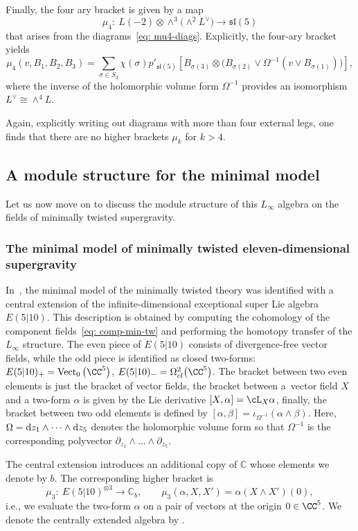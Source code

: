 \documentclass[pdftex]{sigma}
\numberwithin{equation}{section}
\theoremstyle{definition}
\def\C{\mathbb{C}}
\DeclareMathOperator{\Vect}{Vect}
\def\d{{\rm d}}
\begin{document}
Finally, the four ary bracket is given by a map
\[
 \mu_4 \colon\ L(-2) \otimes \wedge^3\big(\wedge^2 L^\vee\big) \longrightarrow \mathfrak{sl}(5)
\]
that arises from the diagrams~\eqref{eq: mu4-diags}. Explicitly, the four-ary bracket yields
\[
 \mu_4(v,B_1,B_2,B_3) = \sum_{\sigma \in S_3} \chi(\sigma) p'_{\mathfrak{sl}(5)} \left[ B_{\sigma(3)} \otimes \big( B_{\sigma(2)} \vee \Omega^{-1} (v \vee B_{\sigma(1)}) \big) \right],
\]
where the inverse of the holomorphic volume form $\Omega^{-1}$ provides an isomorphism $L^\vee \cong \wedge^4 L$.

Again, explicitly writing out diagrams with more than four external legs, one finds that there are no higher brackets $\mu_k$ for $k>4$.


\subsection{A module structure for the minimal model} \label{sec: min-module}
Let us now move on to discuss the module structure of this $L_\infty$ algebra on the fields of minimally twisted supergravity.

\subsubsection{The minimal model of minimally twisted eleven-dimensional supergravity}
In~\cite{RSW}, the minimal model of the minimally twisted theory was identified with a central extension of the infinite-dimensional exceptional super Lie algebra $E(5|10)$. This description is obtained by computing the cohomology of the component fields~\eqref{eq: comp-min-tw} and performing the homotopy transfer of the $L_\infty$ structure. The even piece of $E(5|10)$ consists of divergence-free vector fields, while the odd piece is identified as closed two-forms:
$
 E(5|10)_+ = \Vect_0\big(\CC^5\big) $, $ E(5|10)_- = \Omega^2_{cl}\big(\CC^5\big) $.
The bracket between two even elements is just the bracket of vector fields, the bracket between a~vector field $X$ and a two-form $\alpha$ is given by the Lie derivative
$
 [X,\alpha] = \cL_X \alpha$,
finally, the bracket between two odd elements is defined by
$
 [\alpha, \beta] = \iota_{\Omega^{-1}} (\alpha \wedge \beta)$.
Here, $\Omega = \d z_1 \wedge \dots \wedge \d z_5$ denotes the holomorphic volume form so that $\Omega^{-1}$ is the corresponding polyvector $\partial_{z_1} \wedge \dots \wedge \partial_{z_5}$.

The central extension introduces an additional copy of $\C$ whose elements we denote by $b$. The corresponding higher bracket is
\[ %
 \mu_3\colon\ E(5|10)^{\otimes 3} \longrightarrow \C_b, \qquad \mu_3(\alpha, X, X') = \alpha(X \wedge X')(0) ,
\]
i.e., we evaluate the two-form $\alpha$ on a pair of vectors at the origin $0 \in \CC^5$. We denote the centrally extended algebra by .
\end{document}
